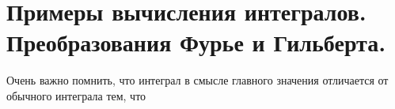 \newpage
\section{Примеры вычисления интегралов. Преобразования Фурье и Гильберта.}

Очень важно помнить, что интеграл в смысле главного значения отличается от обычного интеграла тем, что